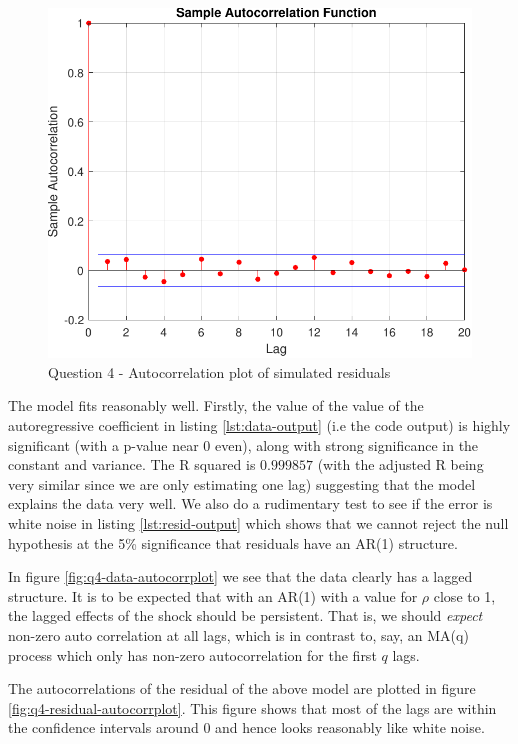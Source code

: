\documentclass[11pt]{article}
\begin{document}
\begin{enumerate}
\begin{figure}[htp]
\centering
\includegraphics[scale=0.75]{residual-simulated-autocorrelation-plot.pdf}
\caption{Question 4 - Autocorrelation plot of simulated residuals}
\label{fig:q4-residual-simulated-autocorrplot}
\end{figure}

The model fits reasonably well. Firstly, the value of the value of the autoregressive coefficient in listing \ref{lst:data-output} (i.e the code output) is highly significant (with a p-value near 0 even), along with strong significance in the constant and variance. The R squared is \( 0.999857 \) (with the adjusted R being very similar since we are only estimating one lag) suggesting that the model explains the data very well. We also do a rudimentary test to see if the error is white noise in listing \ref{lst:resid-output} which shows that we cannot reject the null hypothesis at the 5\% significance that residuals have an AR(1) structure.

In figure \ref{fig:q4-data-autocorrplot} we see that the data clearly has a lagged structure. It is to be expected that with an AR(1) with a value for \( \rho \) close to 1, the lagged effects of the shock should be persistent. That is, we should {\itshape expect} non-zero auto correlation at all lags, which is in contrast to, say, an MA(q) process which only has non-zero autocorrelation for the first \( q \) lags. 

The autocorrelations of the residual of the above model are plotted in figure \ref{fig:q4-residual-autocorrplot}. This figure shows that most of the lags are within the confidence intervals around 0 and hence looks reasonably like white noise.


\end{enumerate}
\end{document}
